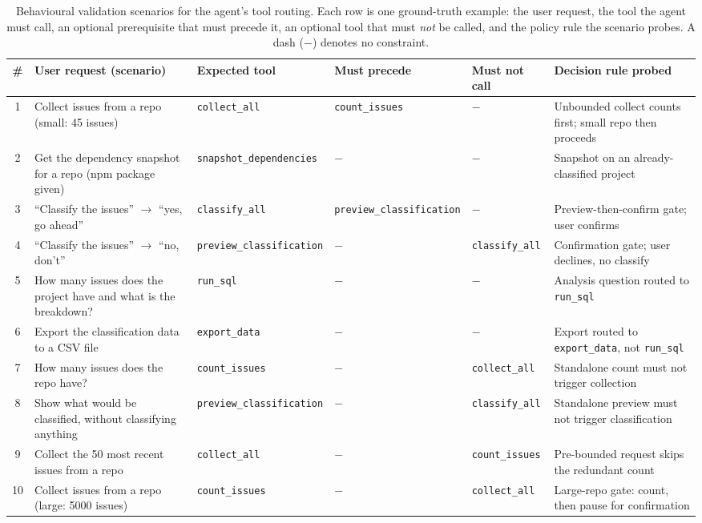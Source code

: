 
\begin{table}[t]
  \centering\small
  \caption{Behavioural validation scenarios for the agent's tool routing. Each
           row is one ground-truth example: the user request, the tool the agent
           must call, an optional prerequisite that must precede it, an optional
           tool that must \emph{not} be called, and the policy rule the scenario
           probes. A dash ($-$) denotes no constraint.}
  \label{tab:routing}
  \begin{tabularx}{\linewidth}{@{}c >{\raggedright\arraybackslash}X l l l >{\raggedright\arraybackslash}X@{}}
    \toprule
    \textbf{\#} & \textbf{User request (scenario)} & \textbf{Expected tool} & \textbf{Must precede} & \textbf{Must not call} & \textbf{Decision rule probed} \\
    \midrule
    1  & Collect issues from a repo (small: 45 issues) & \texttt{collect\_all} & \texttt{count\_issues} & $-$ & Unbounded collect counts first; small repo then proceeds \\
    2  & Get the dependency snapshot for a repo (npm package given) & \texttt{snapshot\_dependencies} & $-$ & $-$ & Snapshot on an already-classified project \\
    3  & ``Classify the issues'' $\rightarrow$ ``yes, go ahead'' & \texttt{classify\_all} & \texttt{preview\_classification} & $-$ & Preview-then-confirm gate; user confirms \\
    4  & ``Classify the issues'' $\rightarrow$ ``no, don't'' & \texttt{preview\_classification} & $-$ & \texttt{classify\_all} & Confirmation gate; user declines, no classify \\
    5  & How many issues does the project have and what is the breakdown? & \texttt{run\_sql} & $-$ & $-$ & Analysis question routed to \texttt{run\_sql} \\
    6  & Export the classification data to a CSV file & \texttt{export\_data} & $-$ & $-$ & Export routed to \texttt{export\_data}, not \texttt{run\_sql} \\
    7  & How many issues does the repo have? & \texttt{count\_issues} & $-$ & \texttt{collect\_all} & Standalone count must not trigger collection \\
    8  & Show what would be classified, without classifying anything & \texttt{preview\_classification} & $-$ & \texttt{classify\_all} & Standalone preview must not trigger classification \\
    9  & Collect the 50 most recent issues from a repo & \texttt{collect\_all} & $-$ & \texttt{count\_issues} & Pre-bounded request skips the redundant count \\
    10 & Collect issues from a repo (large: 5000 issues) & \texttt{count\_issues} & $-$ & \texttt{collect\_all} & Large-repo gate: count, then pause for confirmation \\
    \bottomrule
  \end{tabularx}
\end{table}
